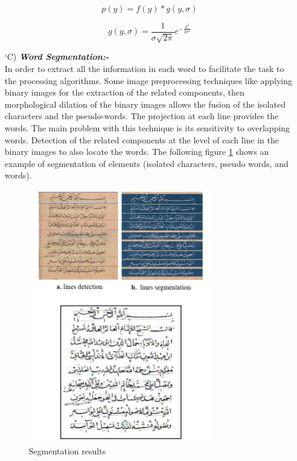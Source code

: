 \begin{itemize}[labelindent=1em,labelsep=0.25cm,leftmargin=*]
        \begin{equation}
            p(y) = f(y)*g(y,\sigma) 
        \label{equ:gaussian-filter}
        \end{equation}
        
        \begin{equation}
            g(y, \sigma) = \frac{1}{\sigma \sqrt{2 \pi}} e^{-\frac{y^2}{2\sigma^2}}
        \label{equ:signal-function}
        \end{equation}
        
        \item[\char `C)] \textit{\textbf{Word Segmentation:-}} \\
        In order to extract all the information in each word to facilitate the task to the processing algorithms. Some image preprocessing techniques like applying binary images for the extraction of the related components, then morphological dilation of the binary images allows the fusion of the isolated characters and the pseudo-words. The projection at each line provides the words. The main problem with this technique is its sensitivity to overlapping words. Detection of the related components at the level of each line in the binary images to also locate the words.
        The following figure \ref{fig:noureddine-word-line} shows an example of segmentation of elements (isolated characters, pseudo words, and words).
        
        \begin{figure}[!htb]
            \centering
            \includegraphics[width=8cm]{images/noureddine-line-word-segmentation.png}
            \caption{Segmentation results}
            \label{fig:noureddine-word-line}
        \end{figure}
        

\end{itemize}
